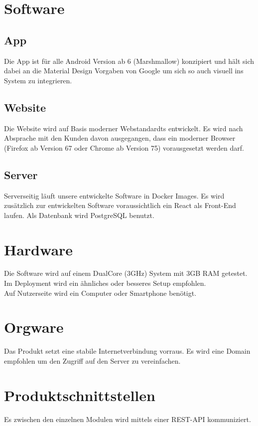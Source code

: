 \section{Software}

\subsection{App}
Die App ist für alle Android Version ab 6 (Marshmallow) konzipiert und hält sich dabei an die Material Design Vorgaben von Google um sich so auch visuell ins System zu integrieren.

\subsection{Website}
Die Website wird auf Basis moderner Webstandardts entwickelt. Es wird nach Absprache mit den Kunden davon ausgegangen, dass ein moderner Browser (Firefox ab Version 67 oder Chrome ab Version 75) vorausgesetzt werden darf.

\subsection{Server} 
Serverseitig läuft unsere entwickelte Software in Docker Images. Es wird zusätzlich zur entwickelten Software voraussichtlich ein React als Front-End laufen.
Als Datenbank wird PostgreSQL benutzt.

\section{Hardware}
Die Software wird auf einem DualCore (3GHz) System mit 3GB RAM getestet. Im Deployment wird ein ähnliches oder besseres Setup empfohlen.\\

Auf Nutzerseite wird ein Computer oder Smartphone benötigt. 
\section{Orgware}

Das Produkt setzt eine stabile Internetverbindung vorraus. Es wird eine Domain empfohlen um den Zugriff auf den Server zu vereinfachen.

\section{Produktschnittstellen}
Es zwischen den einzelnen Modulen wird mittels einer REST-API kommuniziert.
